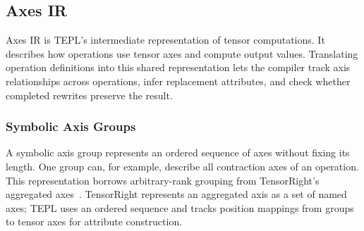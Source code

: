 \FloatBarrier
\subsection{Axes IR}
\label{sec:axes-ir}
Axes IR is TEPL's intermediate representation of tensor computations. It
describes how operations use tensor axes and compute output values.
Translating operation definitions into this shared representation lets the
compiler track axis relationships across operations, infer replacement
attributes, and check whether completed rewrites preserve the result.

\FloatBarrier
\subsubsection{Symbolic Axis Groups}
\label{sec:axis-groups}
A symbolic axis group represents an ordered sequence of axes without fixing
its length. One group can, for example, describe all contraction axes of an
operation. This representation borrows arbitrary-rank grouping from
TensorRight's aggregated axes~\cite{tensorright}. TensorRight represents an
aggregated axis as a set of named axes; TEPL uses an ordered sequence and
tracks position mappings from groups to tensor axes for attribute construction.

